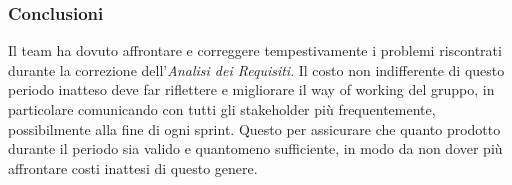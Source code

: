 \subsubsection{Conclusioni}
Il team ha dovuto affrontare e correggere tempestivamente i problemi riscontrati durante la correzione dell'\textit{Analisi dei Requisiti}. Il costo non indifferente di questo periodo inatteso deve far riflettere e migliorare il way of working del gruppo, in particolare comunicando con tutti gli stakeholder più frequentemente, possibilmente alla fine di ogni sprint. Questo per assicurare che quanto prodotto durante il periodo sia valido e quantomeno sufficiente, in modo da non dover più affrontare costi inattesi di questo genere.
